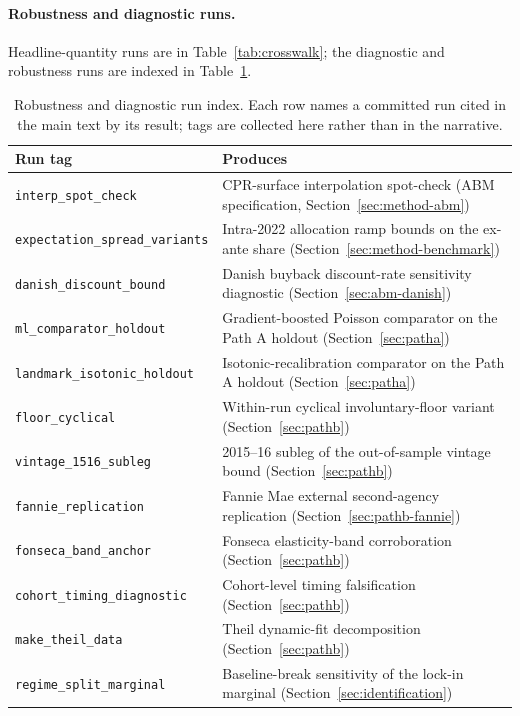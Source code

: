 \documentclass[12pt]{article}
\begin{document}
\paragraph{Robustness and diagnostic runs.} Headline-quantity runs are in Table~\ref{tab:crosswalk}; the diagnostic and robustness runs are indexed in Table~\ref{tab:runindex}.

\begin{table}[H]
\centering
\footnotesize
\begin{threeparttable}
\caption{Robustness and diagnostic run index. Each row names a committed run cited in the main text by its result; tags are collected here rather than in the narrative.}
\label{tab:runindex}
\begin{tabular}{@{}p{5.4cm}p{8.8cm}@{}}
\toprule
Run tag & Produces \\
\midrule
\texttt{interp\_spot\_check} & CPR-surface interpolation spot-check (ABM specification, Section~\ref{sec:method-abm}) \\
\texttt{expectation\_spread\_variants} & Intra-2022 allocation ramp bounds on the ex-ante share (Section~\ref{sec:method-benchmark}) \\
\texttt{danish\_discount\_bound} & Danish buyback discount-rate sensitivity diagnostic (Section~\ref{sec:abm-danish}) \\
\texttt{ml\_comparator\_holdout} & Gradient-boosted Poisson comparator on the Path A holdout (Section~\ref{sec:patha}) \\
\texttt{landmark\_isotonic\_holdout} & Isotonic-recalibration comparator on the Path A holdout (Section~\ref{sec:patha}) \\
\texttt{floor\_cyclical} & Within-run cyclical involuntary-floor variant (Section~\ref{sec:pathb}) \\
\texttt{vintage\_1516\_subleg} & 2015--16 subleg of the out-of-sample vintage bound (Section~\ref{sec:pathb}) \\
\texttt{fannie\_replication} & Fannie Mae external second-agency replication (Section~\ref{sec:pathb-fannie}) \\
\texttt{fonseca\_band\_anchor} & Fonseca elasticity-band corroboration (Section~\ref{sec:pathb}) \\
\texttt{cohort\_timing\_diagnostic} & Cohort-level timing falsification (Section~\ref{sec:pathb}) \\
\texttt{make\_theil\_data} & Theil dynamic-fit decomposition (Section~\ref{sec:pathb}) \\
\texttt{regime\_split\_marginal} & Baseline-break sensitivity of the lock-in marginal (Section~\ref{sec:identification}) \\

\end{tabular}
\end{threeparttable}
\end{table}
\end{document}
